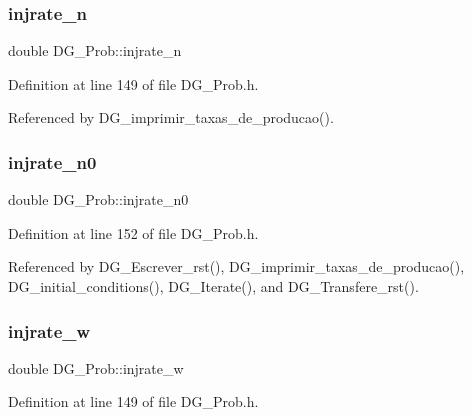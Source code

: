 \subsubsection{\texorpdfstring{injrate\+\_\+n}{injrate\_n}}
{\footnotesize\ttfamily double D\+G\+\_\+\+Prob\+::injrate\+\_\+n\hspace{0.3cm}{\ttfamily [private]}}



Definition at line 149 of file D\+G\+\_\+\+Prob.\+h.



Referenced by D\+G\+\_\+imprimir\+\_\+taxas\+\_\+de\+\_\+producao().

\mbox{\label{classDG__Prob_adecea13d0f4c0c9e820a3fba55d292ed}} 
\subsubsection{\texorpdfstring{injrate\+\_\+n0}{injrate\_n0}}
{\footnotesize\ttfamily double D\+G\+\_\+\+Prob\+::injrate\+\_\+n0\hspace{0.3cm}{\ttfamily [private]}}



Definition at line 152 of file D\+G\+\_\+\+Prob.\+h.



Referenced by D\+G\+\_\+\+Escrever\+\_\+rst(), D\+G\+\_\+imprimir\+\_\+taxas\+\_\+de\+\_\+producao(), D\+G\+\_\+initial\+\_\+conditions(), D\+G\+\_\+\+Iterate(), and D\+G\+\_\+\+Transfere\+\_\+rst().

\mbox{\label{classDG__Prob_a1208fdc3b8a7a1d926400cb818c00552}} 
\subsubsection{\texorpdfstring{injrate\+\_\+w}{injrate\_w}}
{\footnotesize\ttfamily double D\+G\+\_\+\+Prob\+::injrate\+\_\+w\hspace{0.3cm}{\ttfamily [private]}}



Definition at line 149 of file D\+G\+\_\+\+Prob.\+h.



